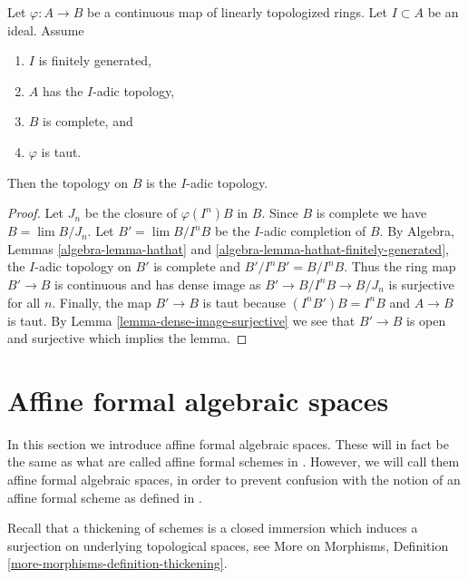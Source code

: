 \begin{lemma}
\label{lemma-taut-is-adic}
Let $\varphi : A \to B$ be a continuous map of linearly topologized rings.
Let $I \subset A$ be an ideal. Assume
\begin{enumerate}
\item $I$ is finitely generated,
\item $A$ has the $I$-adic topology,
\item $B$ is complete, and
\item $\varphi$ is taut.
\end{enumerate}
Then the topology on $B$ is the $I$-adic topology.
\end{lemma}

\begin{proof}
Let $J_n$ be the closure of $\varphi(I^n)B$ in $B$.
Since $B$ is complete we have $B = \lim B/J_n$.
Let $B' = \lim B/I^nB$ be the $I$-adic completion of $B$.
By Algebra, Lemmas \ref{algebra-lemma-hathat} and
\ref{algebra-lemma-hathat-finitely-generated},
the $I$-adic topology on $B'$ is complete and
$B'/I^nB' = B/I^nB$. Thus the ring map $B' \to B$ is continuous
and has dense image as $B' \to B/I^nB \to B/J_n$ is surjective
for all $n$. Finally, the map $B' \to B$ is taut
because $(I^nB')B = I^nB$ and $A \to B$ is taut.
By Lemma \ref{lemma-dense-image-surjective} we see that $B' \to B$ is open
and surjective which implies the lemma.
\end{proof}



\section{Affine formal algebraic spaces}
\label{section-affine-formal-algebraic-spaces}

\noindent
In this section we introduce affine formal algebraic spaces.
These will in fact be the same as what are called affine
formal schemes in \cite{BVGD}. However, we will call
them affine formal algebraic spaces, in order to prevent confusion with
the notion of an affine formal scheme as defined in \cite{EGA}.

\medskip\noindent
Recall that a thickening of schemes is a closed
immersion which induces a surjection on underlying topological
spaces, see More on Morphisms, Definition
\ref{more-morphisms-definition-thickening}.

